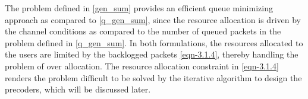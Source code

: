 The problem defined in \eqref{gen_sum} provides an efficient queue minimizing approach as compared to \eqref{q_gen_sum}, since the resource allocation is driven by the channel conditions as compared to the number of queued packets in the problem defined in \eqref{q_gen_sum}. In both formulations, the resources allocated to the users are limited by the backlogged packets \eqref{eqn-3.1.4}, thereby handling the problem of over allocation. The resource allocation constraint in \eqref{eqn-3.1.4} renders the problem difficult to be solved by the iterative algorithm to design the precoders, which will be discussed later.
